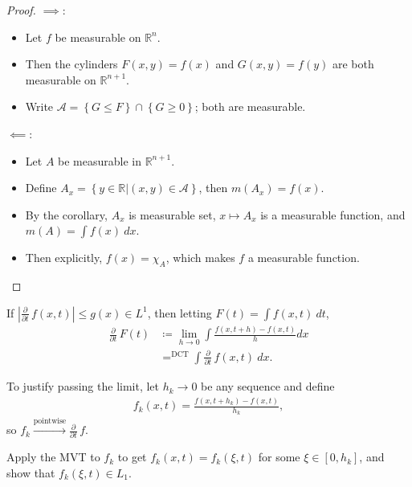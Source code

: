 \begin{proof}

\envlist

\(\implies\):

\begin{itemize}
\tightlist
\item
  Let \(f\) be measurable on \({\mathbb{R}}^n\).
\item
  Then the cylinders \(F(x, y) = f(x)\) and \(G(x, y) = f(y)\) are both
  measurable on \({\mathbb{R}}^{n+1}\).
\item
  Write
  \(\mathcal{A} = \left\{{G \leq F}\right\} \cap\left\{{G \geq 0}\right\}\);
  both are measurable.
\end{itemize}

\(\impliedby\):

\begin{itemize}
\tightlist
\item
  Let \(A\) be measurable in \({\mathbb{R}}^{n+1}\).
\item
  Define
  \(A_x = \left\{{y\in {\mathbb{R}}\mathrel{\Big|}(x, y) \in \mathcal{A}}\right\}\),
  then \(m(A_x) = f(x)\).
\item
  By the corollary, \(A_x\) is measurable set, \(x \mapsto A_x\) is a
  measurable function, and \(m(A) = \int f(x) ~dx\).
\item
  Then explicitly, \(f(x) = \chi_{A}\), which makes \(f\) a measurable
  function.
\end{itemize}

\end{proof}

\begin{proposition}

If
\({\left\lvert {{\frac{\partial }{\partial t}\,}f(x, t)} \right\rvert} \leq g(x) \in L^1\),
then letting \(F(t) = \int f(x, t) ~dt\),
\begin{align*}
{\frac{\partial }{\partial t}\,} F(t)
&\coloneqq\lim_{h \rightarrow 0} \int \frac{f(x, t+h)-f(x, t)}{h} d x \\
&\mathop{\mathrm{=}}^{\scriptstyle\text{DCT}} \int {\frac{\partial }{\partial t}\,} f(x, t) ~dx
.\end{align*}

To justify passing the limit, let \(h_k \to 0\) be any sequence and
define
\begin{align*}
f_k(x, t) = \frac{f(x, t+h_k)-f(x, t)}{h_k}
,\end{align*}
so
\(f_k \overset{\text{pointwise}}\to {\frac{\partial }{\partial t}\,}f\).

Apply the MVT to \(f_k\) to get \(f_k(x, t) = f_k(\xi, t)\) for some
\(\xi \in [0, h_k]\), and show that \(f_k(\xi, t) \in L_1\).

\end{proposition}

